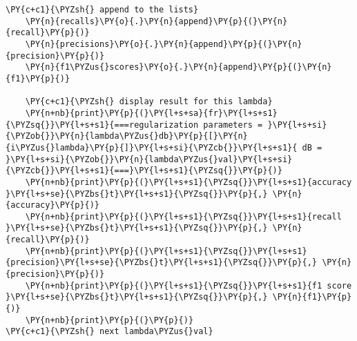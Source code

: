 \begin{tcolorbox}[breakable, size=fbox, boxrule=1pt, pad at break*=1mm,colback=cellbackground, colframe=cellborder]
\begin{Verbatim}[commandchars=\\\{\}]
    \PY{c+c1}{\PYZsh{} append to the lists}
    \PY{n}{recalls}\PY{o}{.}\PY{n}{append}\PY{p}{(}\PY{n}{recall}\PY{p}{)}
    \PY{n}{precisions}\PY{o}{.}\PY{n}{append}\PY{p}{(}\PY{n}{precision}\PY{p}{)}
    \PY{n}{f1\PYZus{}scores}\PY{o}{.}\PY{n}{append}\PY{p}{(}\PY{n}{f1}\PY{p}{)}

    \PY{c+c1}{\PYZsh{} display result for this lambda}
    \PY{n+nb}{print}\PY{p}{(}\PY{l+s+sa}{fr}\PY{l+s+s1}{\PYZsq{}}\PY{l+s+s1}{===regularization parameters = }\PY{l+s+si}{\PYZob{}}\PY{n}{lambda\PYZus{}db}\PY{p}{[}\PY{n}{i\PYZus{}lambda}\PY{p}{]}\PY{l+s+si}{\PYZcb{}}\PY{l+s+s1}{ dB = }\PY{l+s+si}{\PYZob{}}\PY{n}{lambda\PYZus{}val}\PY{l+s+si}{\PYZcb{}}\PY{l+s+s1}{===}\PY{l+s+s1}{\PYZsq{}}\PY{p}{)}
    \PY{n+nb}{print}\PY{p}{(}\PY{l+s+s1}{\PYZsq{}}\PY{l+s+s1}{accuracy }\PY{l+s+se}{\PYZbs{}t}\PY{l+s+s1}{\PYZsq{}}\PY{p}{,} \PY{n}{accuracy}\PY{p}{)}
    \PY{n+nb}{print}\PY{p}{(}\PY{l+s+s1}{\PYZsq{}}\PY{l+s+s1}{recall   }\PY{l+s+se}{\PYZbs{}t}\PY{l+s+s1}{\PYZsq{}}\PY{p}{,} \PY{n}{recall}\PY{p}{)}
    \PY{n+nb}{print}\PY{p}{(}\PY{l+s+s1}{\PYZsq{}}\PY{l+s+s1}{precision}\PY{l+s+se}{\PYZbs{}t}\PY{l+s+s1}{\PYZsq{}}\PY{p}{,} \PY{n}{precision}\PY{p}{)}
    \PY{n+nb}{print}\PY{p}{(}\PY{l+s+s1}{\PYZsq{}}\PY{l+s+s1}{f1 score }\PY{l+s+se}{\PYZbs{}t}\PY{l+s+s1}{\PYZsq{}}\PY{p}{,} \PY{n}{f1}\PY{p}{)}
    \PY{n+nb}{print}\PY{p}{(}\PY{p}{)}
\PY{c+c1}{\PYZsh{} next lambda\PYZus{}val}
\end{Verbatim}
\end{tcolorbox}

